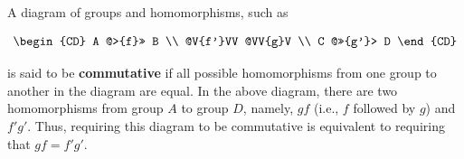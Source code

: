 A diagram of groups and homomorphisms, such as

$$
\begin{CD}
A @>{f}>> B \\
@V{f'}VV @VV{g}V \\
C @>>{g'}> D
\end{CD}
$$

is said to be \textbf{commutative} if all possible homomorphisms from one group to another in the diagram are equal. In the above diagram, there are two homomorphisms from group $A$ to group $D$, namely, $gf$ (i.e., $f$ followed by $g$) and $f'g'$. Thus, requiring this diagram to be commutative is equivalent to requiring that $gf = f'g'$.
